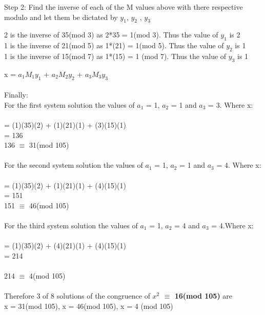\documentclass{article}
\begin{document}
Step 2: Find the inverse of each of the M values above with there respective modulo and let them be dictated by $y_{1}$, $y_{2}$ , $y_{3}$  
\begin{center}
2 is the inverse of 35(mod 3) as 2*35 = 1(mod 3). Thus the value of $y_{1}$ is 2 \\
1 is the inverse of 21(mod 5) as 1*(21) = 1(mod 5). Thus the value of $y_{2}$ is 1 \\ 
1 is the inverse of 15(mod 7) as 1*(15) = 1 (mod 7). Thus the value of $y_{3}$ is 1
\end{center}
x = $a_{1}$$M_{1}$$y_{1}$ + $a_{2}$$M_{2}$$y_{2}$ + $a_{3}$$M_{3}$$y_{3}$ \\\\
Finally:\\
For the first system solution the values of $a_{1}$ = 1, $a_{2}$ = 1 and $a_{3}$ = 3. Where x: \\ \\
= (1)(35)(2) + (1)(21)(1) + (3)(15)(1) \\ 
= 136 \\
136 $\equiv$ 31(mod 105) \\\\
For the second system solution the values of $a_{1}$ = 1, $a_{2}$ = 1 and $a_{3}$ = 4. Where x: \\ \\
= (1)(35)(2) + (1)(21)(1) + (4)(15)(1) \\ 
= 151 \\
151 $\equiv$ 46(mod 105) \\\\
For the third system solution the values of $a_{1}$ = 1, $a_{2}$ = 4 and $a_{3}$ = 4.Where x: \\ \\
= (1)(35)(2) + (4)(21)(1) + (4)(15)(1) \\ 
=  214\\\\
214 $\equiv$ 4(mod 105) \\\\
Therefore 3 of 8 solutions of the congruence of \textbf{ $x^2$ $\equiv$ 16(mod 105)} are \\ x = 31(mod 105), x = 46(mod 105), x = 4 (mod 105)

\newpage
\end{document}
